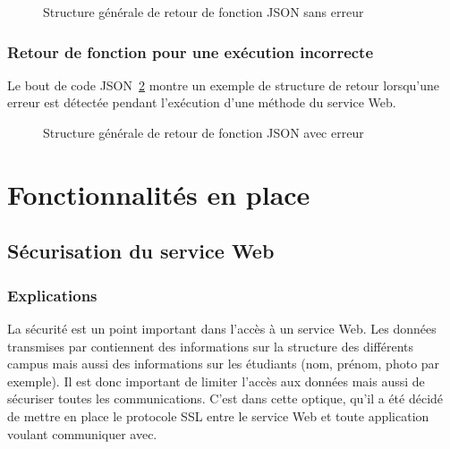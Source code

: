 \begin{figure}[!ht]
	\centering
	
	\caption{Structure g\'en\'erale de retour de fonction JSON sans erreur}
	\label{figure:structureSansErreurJSON}

\end{figure}

\subsubsection{Retour de fonction pour une ex\'ecution incorrecte}

Le bout de code JSON~\ref{figure:structureAvecErreurJSON} montre un exemple de structure de retour lorsqu'une erreur est d\'etect\'ee pendant l'ex\'ecution d'une m\'ethode du service Web.

\begin{figure}[!ht]
	\centering
	
	\caption{Structure g\'en\'erale de retour de fonction JSON avec erreur}
	\label{figure:structureAvecErreurJSON}

\end{figure}


\section{Fonctionnalit\'es en place}

\subsection{S\'ecurisation du service Web}
\label{section:securisation}

\subsubsection{Explications}

La s\'ecurit\'e est un point important dans l'acc\`es \`a un service Web. 
Les donn\'ees transmises par \YuukouII{} contiennent des informations sur la structure des diff\'erents campus mais aussi des informations sur les \'etudiants (nom, pr\'enom, photo par exemple).
Il est donc important de limiter l'acc\`es aux donn\'ees mais aussi de s\'ecuriser toutes les communications.
C'est dans cette optique, qu'il a \'et\'e d\'ecid\'e de mettre en place le protocole SSL entre le service Web et toute application voulant communiquer avec.


